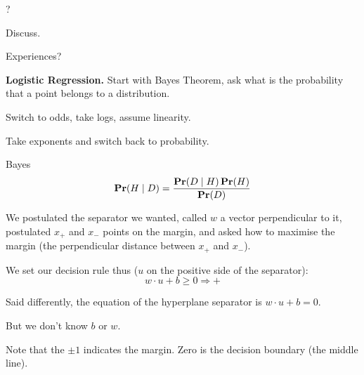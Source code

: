 
\usepackage{epsfig}
\usepackage{bbm}






?

Discuss.



Experiences?



\textbf{Logistic Regression.}  Start with Bayes Theorem, ask what is
the probability that a point belongs to a distribution.

Switch to odds, take logs, assume linearity.

Take exponents and switch back to probability.

\begin{theorem}{Bayes}
  \begin{displaymath}
    \mathbf{Pr}(H\mid D) = \frac{\mathbf{Pr}(D\mid H)\, \mathbf{Pr}(H)}{\mathbf{Pr}(D)}
  \end{displaymath}
\end{theorem}



We postulated the separator we wanted, called $w$ a vector
perpendicular to it, postulated $x_+$ and $x_-$ points on the margin,
and asked how to maximise the margin (the perpendicular distance
between $x_+$ and $x_-$).

\bigskip
\centerline{}
\bigskip

We set our decision rule thus ($u$ on the positive side of the
separator):
\begin{equation}
  \label{eq:decision-rule}
  \boxed{w\cdot u + b \ge 0 \Rightarrow +}
\end{equation}

Said differently, the equation of the hyperplane separator is
$w\cdot u + b = 0$.

But we don't know $b$ or $w$.

Note that the $\pm 1$ indicates the margin.  Zero is the decision
boundary (the middle line).

